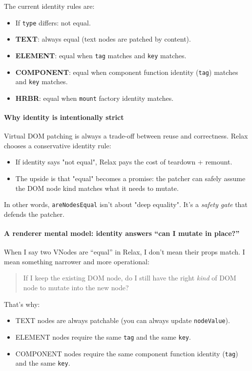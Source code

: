 The current identity rules are:

\begin{itemize}
  \item If \texttt{type} differs: not equal.
  \item \textbf{TEXT}: always equal (text nodes are patched by content).
  \item \textbf{ELEMENT}: equal when \texttt{tag} matches and \texttt{key} matches.
  \item \textbf{COMPONENT}: equal when component function identity (\texttt{tag}) matches and \texttt{key} matches.
  \item \textbf{HRBR}: equal when \texttt{mount} factory identity matches.
\end{itemize}

\paragraph{Why identity is intentionally strict}
Virtual DOM patching is always a trade-off between reuse and correctness. Relax chooses a conservative identity rule:

\begin{itemize}
  \item If identity says "not equal", Relax pays the cost of teardown + remount.
  \item The upside is that "equal" becomes a promise: the patcher can safely assume the DOM node kind matches what it needs to mutate.
\end{itemize}

In other words, \texttt{areNodesEqual} isn't about "deep equality". It's a \emph{safety gate} that defends the patcher.

\paragraph{A renderer mental model: identity answers ``can I mutate in place?''}
When I say two VNodes are ``equal'' in Relax, I don't mean their props match.
I mean something narrower and more operational:

\begin{quote}
If I keep the existing DOM node, do I still have the right \emph{kind} of DOM node to mutate into the new node?
\end{quote}

That’s why:

\begin{itemize}
  \item TEXT nodes are always patchable (you can always update \texttt{nodeValue}).
  \item ELEMENT nodes require the same \texttt{tag} and the same \texttt{key}.
  \item COMPONENT nodes require the same component function identity (\texttt{tag}) and the same \texttt{key}.
\end{itemize}

